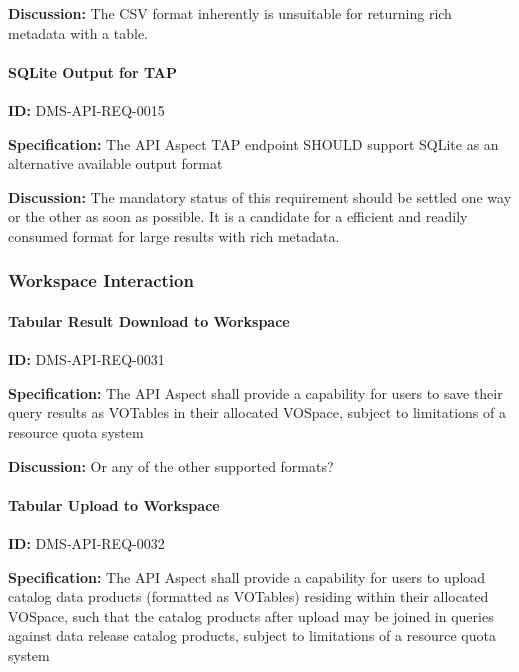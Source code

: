 \documentclass[SE,toc,lsstdraft]{lsstdoc}
\begin{document}
\textbf{Discussion:}
The CSV format inherently is unsuitable for returning rich metadata with a table.

\paragraph{SQLite Output for TAP}\hfill  %

\label{DMS-API-REQ-0015}
\textbf{ID:} DMS-API-REQ-0015

\textbf{Specification:}
The API Aspect TAP endpoint SHOULD support SQLite as an alternative available output format

\textbf{Discussion:}
The mandatory status of this requirement should be settled one way or the other as soon as possible.  It is a candidate for a efficient and readily consumed format for large results with rich metadata.

\subsubsection{Workspace Interaction}

\paragraph{Tabular Result Download to Workspace}\hfill  %

\label{DMS-API-REQ-0031}
\textbf{ID:} DMS-API-REQ-0031

\textbf{Specification:}
The API Aspect shall provide a capability for users to save their query results as VOTables in their allocated VOSpace, subject to limitations of a resource quota system

\textbf{Discussion:}
Or any of the other supported formats?

\paragraph{Tabular Upload to Workspace}\hfill  %

\label{DMS-API-REQ-0032}
\textbf{ID:} DMS-API-REQ-0032

\textbf{Specification:}
The API Aspect shall provide a capability for users to upload catalog data products (formatted as VOTables) residing within their allocated VOSpace, such that the catalog products after upload may be joined in queries against data release catalog products, subject to limitations of a resource quota system
\end{document}
